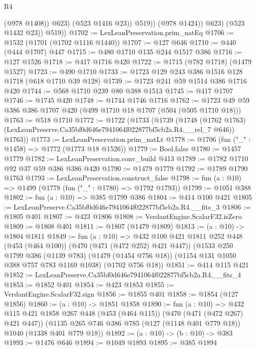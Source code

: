 \begin{lexlean}{R4}
\begin{coremodule}
                        (@978 @1408))
                      @623)
                    (@523 @1416 @23))
                  @519))
              (@978 @1424))
            @623)
          (@523 @1432 @23))
        @519))
@1702 := LexLeanPreservation.prim_natEq
@1706 := @1532 (@1701 (@1702 @1116 @1440))
@1707 := @127 @646
@1710 := @440 (@444 @1707) @447
@1715 := @480 @1710 @135 @244 @1517 @386
@1716 := @127 @1526
@1718 := @417 @1716 @420
@1722 := @1715 (@782 @1718) (@1479 @1527)
@1723 := @490 @1710
@1733 := @1723 @129 @243 @386 @1516 @128 @1718 (@618 @1710 @39 @128)
@1739 := @1723 @241 @59 @1514 @386 @1716 @420
@1744 := @568 @1710 @239 @80 @388 @1513
@1745 := @417 @1707
@1746 := @1745 @420
@1748 := @1744 @1746 @1716
@1762 := @1723 @49 @59 @386 @386 @1707 @420 (@499 @1710 @18 @1707 (@504 (@505 @1710 @18)))
@1763 := @518 @1710
@1772 := @1722
    (@1733
      (@1739
        (@1748 (@1762 @1763) (LexLeanPreserve.Ca35bf0d646e7941064f022877bf5cb2a.R4.__rel_7 @646))
        @1763))
@1773 := LexLeanPreservation.prim_natLt
@1778 := @1706 (fun ("_" : @1458) => @1772 (@1773 @18 @1526))
@1779 := Bool.false
@1780 := @1457 @1779
@1782 := LexLeanPreservation.conv_build @413
@1789 := @1782 @1710 @92 @37 @59 @386 @386 @420
@1790 := @1479 @1779
@1792 := @1789 @1790 @1763
@1793 := LexLeanPreservation.construct_false
@1798 := fun (a : @10) => @1499 (@1778 (fun ("_" : @1780) => @1792 @1793))
@1799 := @1051 @388
@1802 := fun (a : @10) => @385 @1799 @386
@1804 := @414 @100 @421
@1805 := LexLeanPreserve.Ca35bf0d646e7941064f022877bf5cb2a.R4.__fits_3
@1806 := @1805 @401
@1807 := @423 @1806
@1808 := VerdantEngine.ScalarF32.isZero
@1809 := @1808 @401
@1811 := @1807 (@1479 @1809)
@1813 := (a : @10) -> @1804 @1811
@1849 := fun (a : @10) =>
  @432
    @100
    @421
    @1811
    @252
    @448
    (@453 (@464 @100))
    (@470 (@471 (@472 @252) @421 @447))
    (@1533
      @250
      @1799
      @386
      (@1139 @783)
      (@1479 (@1454 @756 @18))
      (@1154 @131 @1050 @388 @757 @783 @1169 @1038)
      (@1702 @756 @18))
@1851 := @414 @115 @421
@1852 := LexLeanPreserve.Ca35bf0d646e7941064f022877bf5cb2a.R4.__fits_4
@1853 := @1852 @401
@1854 := @423 @1853
@1855 := VerdantEngine.ScalarF32.sign
@1856 := @1855 @401
@1858 := @1854 (@127 @1856)
@1860 := (a : @10) -> @1851 @1858
@1890 := fun (a : @10) =>
  @432
    @115
    @421
    @1858
    @267
    @448
    (@453 (@464 @115))
    (@470 (@471 (@472 @267) @421 @447))
    (@1135 @265 @746 @386 @785 (@127 (@1148 @401 @779 @18)) @1040 (@1338 @401 @779 @18))
@1892 := (a : @10) -> (b : @10) -> @383
@1893 := @1476 @646
@1894 := @1049 @1893
@1895 := @385 @1894

\end{coremodule}
\end{lexlean}
